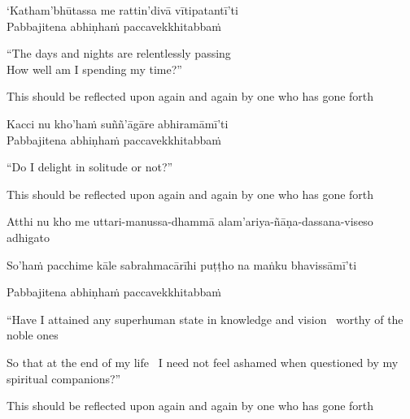 `Katham'bhūtassa me rattin'divā vītipatantī'ti\\
Pabbajitena abhiṇhaṁ paccavekkhitabbaṁ

\begin{english-verses}
  ``The days and nights are relentlessly passing\\
  How well am I spending my time?''
  \begin{english-hang-together-verses}
    This should be reflected upon again and again by one who has gone forth
  \end{english-hang-together-verses}
\end{english-verses}

Kacci nu kho'haṁ suññ'āgāre abhiramāmī'ti\\
Pabbajitena abhiṇhaṁ paccavekkhitabbaṁ

\begin{english-verses}
  ``Do I delight in solitude or not?''
  \begin{english-hang-together-verses}
    This should be reflected upon again and again by one who has gone forth
  \end{english-hang-together-verses}
\end{english-verses}

\begin{pali-hang}
  Atthi nu kho me uttari-manussa-dhammā alam'ariya-ñāṇa-dassana-viseso adhigato
\end{pali-hang}
\begin{pali-hang-together}
  So'haṁ pacchime kāle sabrahmacārīhi puṭṭho na maṅku bhavissāmī'ti
\end{pali-hang-together}
\begin{pali-hang-together}
  Pabbajitena abhiṇhaṁ paccavekkhitabbaṁ
\end{pali-hang-together}

\ifafive\clearpage\fi

\begin{english-verses}
  \begin{english-hang-first-line}
  ``Have I attained any superhuman state in knowledge and vision \breathmark\ worthy of the noble ones\ifdigital\makeatletter\hyperlink{endnote166-appendix}\makeatother\fi \\
  \end{english-hang-first-line}
  \begin{english-hang-together-verses}
    So that at the end of my life \breathmark\ I need not feel ashamed when questioned by my spiritual companions?''
  \end{english-hang-together-verses}
  \begin{english-hang-together-verses}
    This should be reflected upon again and again by one who has gone forth
  \end{english-hang-together-verses}
\end{english-verses}

